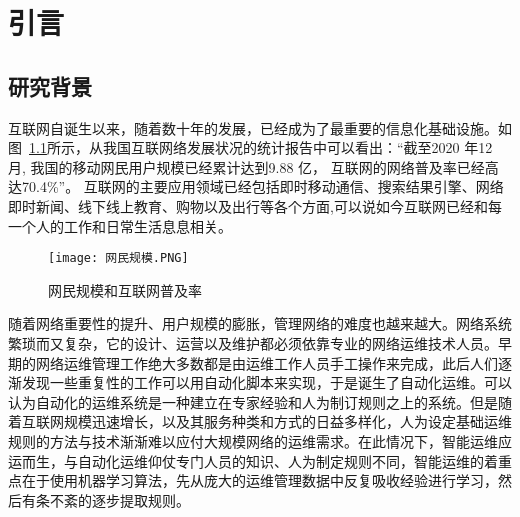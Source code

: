 
\chapter{引言}


\section{研究背景}

互联网自诞生以来，随着数十年的发展，已经成为了最重要的信息化基础设施。如图~\ref{fig:网民规模和互联网普及率}所示，从我国互联网络发展状况的统计报告\cite{cac.gov}中可以看出：“截至2020 年12 月, 我国的移动网民用户规模已经累计达到9.88 亿， 互联网的网络普及率已经高达70.4\%”。
互联网的主要应用领域已经包括即时移动通信、搜索结果引擎、网络即时新闻、线下线上教育、购物以及出行等各个方面,可以说如今互联网已经和每一个人的工作和日常生活息息相关。



\begin{figure}
    \centering
    \texttt{[image: 网民规模.PNG]}
    \caption{网民规模和互联网普及率}
    \label{fig:网民规模和互联网普及率}
  \end{figure}

随着网络重要性的提升、用户规模的膨胀，管理网络的难度也越来越大。网络系统繁琐而又复杂，它的设计、运营以及维护都必须依靠专业的网络运维技术人员。早期的网络运维管理工作绝大多数都是由运维工作人员手工操作来完成，此后人们逐渐发现一些重复性的工作可以用自动化脚本来实现，于是诞生了自动化运维。可以认为自动化的运维系统是一种建立在专家经验和人为制订规则之上的系统。但是随着互联网规模迅速增长，以及其服务种类和方式的日益多样化，人为设定基础运维规则的方法与技术渐渐难以应付大规模网络的运维需求。在此情况下，智能运维应运而生，与自动化运维仰仗专门人员的知识、人为制定规则不同，智能运维的着重点在于使用机器学习算法，先从庞大的运维管理数据中反复吸收经验进行学习，然后有条不紊的逐步提取规则。


